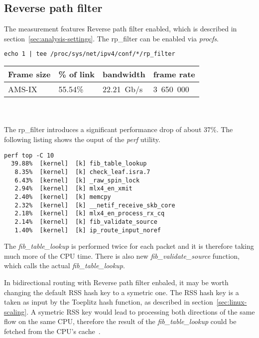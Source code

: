 
\subsection{Reverse path filter}
The measurement features Reverse path filter enabled, which is described in section~\ref{sec:analysis-settings}.
The rp\_filter can be enabled via {\it{procfs}}.
\begin{lstlisting}[language=TeX]
echo 1 | tee /proc/sys/net/ipv4/conf/*/rp_filter
\end{lstlisting}

\begin{tabular}{ | l | l | l | l | }
\hline
Frame size & \% of link & bandwidth & frame rate \\
\hline
AMS-IX & 55.54\% & 22.21~Gb/s & 3~650~000 \\
\hline
\end{tabular}
\\
\\
The rp\_filter introduces a significant performance drop of about 37\%.
The following listing shows the ouput of the {\it{perf}} utility.
\begin{lstlisting}
perf top -C 10
  39.88%  [kernel]  [k] fib_table_lookup
   8.35%  [kernel]  [k] check_leaf.isra.7
   6.43%  [kernel]  [k] _raw_spin_lock
   2.94%  [kernel]  [k] mlx4_en_xmit
   2.40%  [kernel]  [k] memcpy
   2.32%  [kernel]  [k] __netif_receive_skb_core
   2.18%  [kernel]  [k] mlx4_en_process_rx_cq
   2.14%  [kernel]  [k] fib_validate_source
   1.40%  [kernel]  [k] ip_route_input_noref
\end{lstlisting}
The {\it{fib\_table\_lookup}} is performed twice for each packet
and it is therefore taking much more of the CPU time.
There is also new {\it{fib\_validate\_source}} function, which calls
the actual {\it{fib\_table\_lookup}}.

In bidirectional routing with Reverse path filter enbaled,
it may be worth changing the default RSS hash key to a symetric one.
The RSS hash key is a taken as input by the Toeplitz hash function, as described in section~\ref{sec:linux-scaling}.
A symetric RSS key would lead to processing both directions of the same flow on the same CPU,
therefore the result of the {\it{fib\_table\_lookup}} could be fetched from the CPU's cache~\cite{symetric-rss}.
